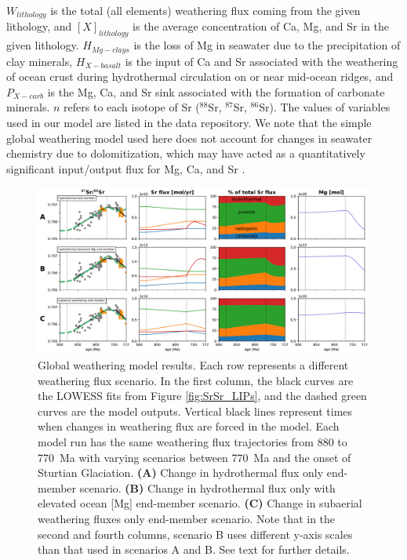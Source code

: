 \documentclass[11pt,letterpaper]{article}
\begin{document}
$W_{lithology}$ is the total (all elements) weathering flux coming from the given lithology, and $[X]_{lithology}$ is the average concentration of Ca, Mg, and Sr in the given lithology. $H_{Mg-clays}$ is the loss of Mg in seawater due to the precipitation of clay minerals, $H_{X-basalt}$ is the input of Ca and Sr associated with the weathering of ocean crust during hydrothermal circulation on or near mid-ocean ridges, and $P_{X-carb}$ is the Mg, Ca, and Sr sink associated with the formation of carbonate minerals. $n$ refers to each isotope of Sr ($^{88}$Sr, $^{87}$Sr, $^{86}$Sr). The values of variables used in our model are listed in the data repository. We note that the simple global weathering model used here does not account for changes in seawater chemistry due to dolomitization, which may have acted as a quantitatively significant input/output flux for Mg, Ca, and Sr \citep{Fantle2014a}.

\begin{figure}[h!]
\begin{center}
	\includegraphics[width=\textwidth]{Figures/Sr_Model_Flux_Changes.pdf}
	\caption{Global weathering model results. Each row represents a different weathering flux scenario. In the first column, the black curves are the LOWESS fits from Figure \ref{fig:SrSr_LIPs}, and the dashed green curves are the model outputs. Vertical black lines represent times when changes in weathering flux are forced in the model. Each model run has the same weathering flux trajectories from 880 to 770~Ma with varying scenarios between 770~Ma and the onset of Sturtian Glaciation. \textbf{(A)} Change in hydrothermal flux only end-member scenario. \textbf{(B)} Change in hydrothermal flux only with elevated ocean [Mg] end-member scenario. \textbf{(C)} Change in subaerial weathering fluxes only end-member scenario. Note that in the second and fourth columns, scenario B uses different y-axis scales than that used in scenarios A and B. See text for further details.}
	\label{fig:Sr_Model_Flux_Changes}
\end{center}
\end{figure}
\end{document}
